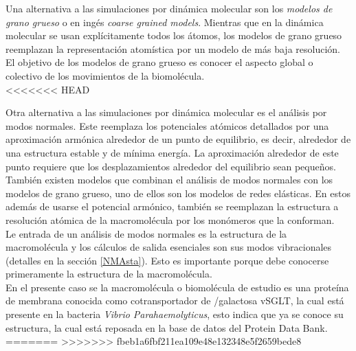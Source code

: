 Una alternativa a las simulaciones por din\'{a}mica molecular son los \textit{modelos de grano grueso} o en ing\'{e}s \textit{coarse grained models}.  Mientras que en la din\'{a}mica molecular se usan expl\'{i}citamente todos los \'{a}tomos, los modelos de grano grueso reemplazan la representaci\'{o}n atom\'{i}stica por un modelo de m\'{a}s baja resoluci\'{o}n. El objetivo de los modelos de grano grueso es conocer el aspecto global o colectivo de los movimientos de la biomol\'{e}cula.\\
<<<<<<< HEAD

Otra alternativa a las simulaciones por din\'{a}mica molecular es el an\'{a}lisis por modos normales. Este reemplaza los potenciales at\'{o}micos detallados por una aproximaci\'{o}n arm\'{o}nica alrededor de un punto de equilibrio, es decir, alrededor de una estructura estable y de m\'{i}nima energ\'{i}a. La aproximaci\'{o}n alrededor de este punto requiere que los desplazamientos alrededor del equilibrio sean peque\~{n}os.\\

Tambi\'{e}n existen modelos que combinan el an\'{a}lisis de modos normales con los modelos de grano grueso, uno de ellos son los modelos de redes el\'{a}sticas. En estos adem\'{a}s de usarse el potencial arm\'{o}nico, tambi\'{e}n se reemplazan la estructura a resoluci\'{o}n at\'{o}mica de la macromol\'{e}cula por los mon\'{o}meros que la conforman.\\

Le entrada de un an\'{a}lisis de modos normales es la estructura de la macromol\'{e}cula y los c\'{a}lculos de salida esenciales son sus modos vibracionales (detalles en la secci\'{o}n \ref{NMAsta}). Esto es importante porque debe conocerse primeramente la estructura de la macromol\'{e}cula.\\

En el presente caso se la macromol\'{e}cula o biomol\'{e}cula de estudio es una prote\'{i}na de membrana conocida como cotransportador de /galactosa vSGLT, la cual est\'{a} presente en la bacteria \textit{Vibrio Parahaemolyticus}, esto indica que ya se conoce su estructura, la cual est\'{a} reposada en la base de datos del Protein Data Bank.
=======
>>>>>>> fbeb1a6fbf211ea109e48e132348e5f2659bede8
